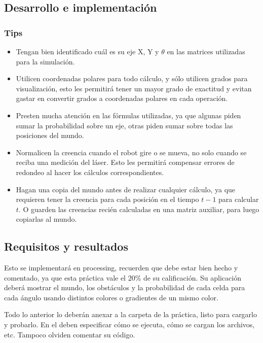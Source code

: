 \parencite{Dieter1999}


\subsection{Desarrollo e implementaci\'on}

\subsubsection{Tips}

\begin{itemize}
  \item Tengan bien identificado cuál es su eje X, Y y \(\theta\) en las matrices utilizadas para la simulación.
  \item Utilicen coordenadas polares para todo cálculo, y sólo utilicen grados para visualización, esto les permitirá tener un mayor grado de exactitud y evitan gastar en convertir grados a coordenadas polares en cada operación.
  \item Presten mucha atención en las fórmulas utilizadas, ya que algunas piden sumar la probabilidad sobre un eje, otras piden sumar sobre todas las posiciones del mundo.
  \item Normalicen la creencia cuando el robot gire o se mueva, no solo cuando se reciba una medición del láser. Esto les permitirá compensar errores de redondeo al hacer los cálculos correspondientes.
  \item Hagan una copia del mundo antes de realizar cualquier cálculo, ya que requieren tener la creencia para cada posición en el tiempo \(t-1\) para calcular \(t\). O guarden las creencias recién calculadas en una matriz auxiliar, para luego copiarlas al mundo.
\end{itemize}


\subsection{Requisitos y resultados}

Esto se implementará en processing, recuerden que debe estar bien hecho y comentado, ya que esta práctica vale el 20\% de su calificación. Su aplicación deberá mostrar el mundo, los obstáculos y la probabilidad de cada celda para cada ángulo usando distintos colores o gradientes de un mismo color.

Todo lo anterior lo deberán anexar a la carpeta de la práctica, listo para cargarlo y probarlo. En el  deben especificar cómo se ejecuta, cómo se cargan los archivos, etc. Tampoco olviden comentar su código.
